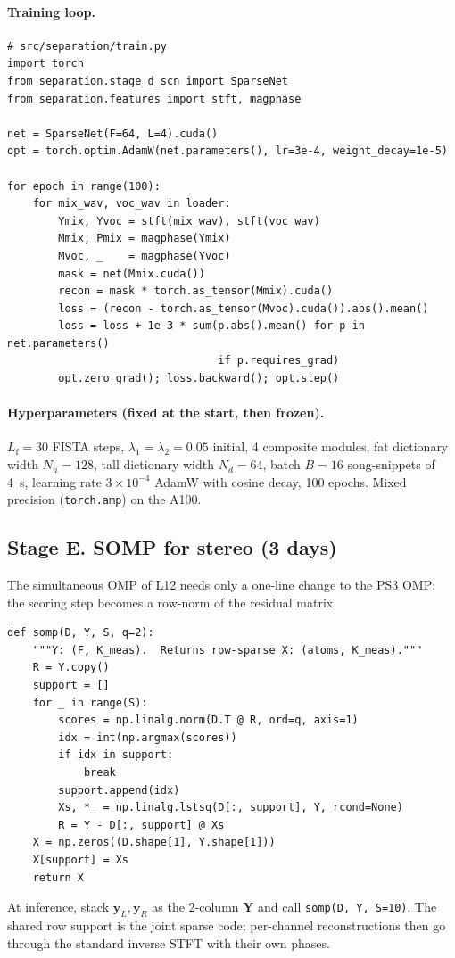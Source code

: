\documentclass[10pt]{article}
\newcommand{\yb}{\bm{y}}
\begin{document}
\paragraph{Training loop.}
\begin{lstlisting}
# src/separation/train.py
import torch
from separation.stage_d_scn import SparseNet
from separation.features import stft, magphase

net = SparseNet(F=64, L=4).cuda()
opt = torch.optim.AdamW(net.parameters(), lr=3e-4, weight_decay=1e-5)

for epoch in range(100):
    for mix_wav, voc_wav in loader:
        Ymix, Yvoc = stft(mix_wav), stft(voc_wav)
        Mmix, Pmix = magphase(Ymix)
        Mvoc, _    = magphase(Yvoc)
        mask = net(Mmix.cuda())
        recon = mask * torch.as_tensor(Mmix).cuda()
        loss = (recon - torch.as_tensor(Mvoc).cuda()).abs().mean()
        loss = loss + 1e-3 * sum(p.abs().mean() for p in net.parameters()
                                 if p.requires_grad)
        opt.zero_grad(); loss.backward(); opt.step()
\end{lstlisting}

\paragraph{Hyperparameters (fixed at the start, then frozen).}
$L_\text{f}{=}30$ FISTA steps, $\lambda_1\!=\!\lambda_2\!=\!0.05$ initial,
4 composite modules, fat dictionary width $N_u\!=\!128$, tall dictionary
width $N_d\!=\!64$, batch $B\!=\!16$ song-snippets of 4~s, learning rate
$3\!\times\!10^{-4}$ AdamW with cosine decay, 100 epochs.  Mixed
precision (\texttt{torch.amp}) on the A100.

\subsection{Stage E. SOMP for stereo (3 days)}
The simultaneous OMP of L12 needs only a one-line change to the PS3 OMP:
the scoring step becomes a row-norm of the residual matrix.

\begin{lstlisting}
def somp(D, Y, S, q=2):
    """Y: (F, K_meas).  Returns row-sparse X: (atoms, K_meas)."""
    R = Y.copy()
    support = []
    for _ in range(S):
        scores = np.linalg.norm(D.T @ R, ord=q, axis=1)
        idx = int(np.argmax(scores))
        if idx in support:
            break
        support.append(idx)
        Xs, *_ = np.linalg.lstsq(D[:, support], Y, rcond=None)
        R = Y - D[:, support] @ Xs
    X = np.zeros((D.shape[1], Y.shape[1]))
    X[support] = Xs
    return X
\end{lstlisting}
At inference, stack $\yb_L,\yb_R$ as the $2$-column $\bm{Y}$ and call
\texttt{somp(D, Y, S=10)}.  The shared row support is the joint sparse
code; per-channel reconstructions then go through the standard inverse
STFT with their own phases.
\end{document}
